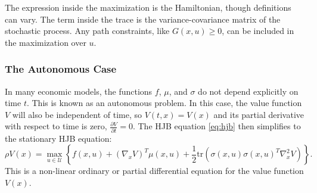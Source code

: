 \documentclass[../../lecture_notes.tex]{subfiles}
\begin{document}
The expression inside the maximization is the Hamiltonian, though definitions can vary.
The term inside the trace is the variance-covariance matrix of the stochastic process.
Any path constraints, like \(G(x,u) \ge 0\), can be included in the maximization over \(u\).

\subsubsection{The Autonomous Case}
In many economic models, the functions \(f\), \(\mu\), and \(\sigma\) do not depend explicitly on time \(t\).
This is known as an autonomous problem.
In this case, the value function \(V\) will also be independent of time, so \(V(t,x) = V(x)\) and its partial derivative with respect to time is zero, \(\frac{\partial V}{\partial t} = 0\).
The HJB equation \eqref{eq:hjb} then simplifies to the stationary HJB equation:
\begin{equation*}
  \rho V(x) = \max_{u \in \mathcal{U}} \left\{ f(x,u) + (\nabla_x V)^T \mu(x,u) + \frac{1}{2} \text{tr}\left( \sigma(x,u) \sigma(x,u)^T \nabla_x^2 V \right) \right\}.
\end{equation*}
This is a non-linear ordinary or partial differential equation for the value function \(V(x)\).
\end{document}
